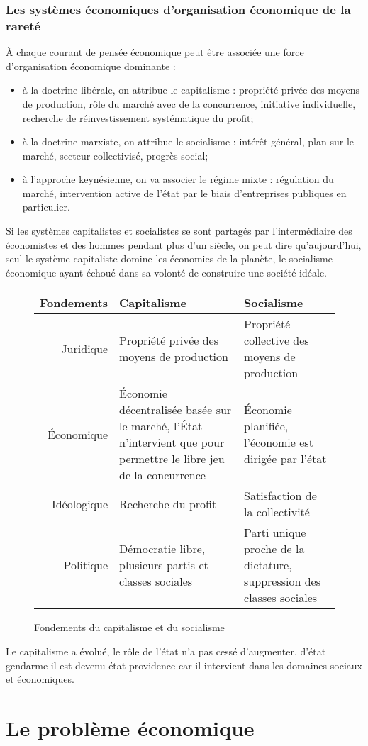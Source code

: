 \documentclass[11pt]{article}
\begin{document}
	\section{Les systèmes économiques d'organisation économique de la rareté}
		À chaque courant de pensée économique peut être associée une force d'organisation économique dominante :
		\begin{itemize}
			\item à la doctrine libérale, on attribue le capitalisme : propriété privée des moyens de production, rôle du marché avec de la concurrence, initiative individuelle, recherche de réinvestissement systématique du profit;
			\item à la doctrine marxiste, on attribue le socialisme : intérêt général, plan sur le marché, secteur collectivisé, progrès social;
			\item à l'approche keynésienne, on va associer le régime mixte : régulation du marché, intervention active de l'état par le biais d'entreprises publiques en particulier.
		\end{itemize}
		
		Si les systèmes capitalistes et socialistes se sont partagés par l'intermédiaire des économistes et des hommes pendant plus d'un siècle, on peut dire qu'aujourd'hui, seul le système capitaliste domine les économies de la planète, le socialisme économique ayant échoué dans sa volonté de construire une société idéale.
		
		\begin{figure}[h!]
			\begin{center}
				\begin{tabular}{|r|p{5cm}|p{5cm}|}
					\hline
					\textbf{Fondements} & \textbf{Capitalisme} & \textbf{Socialisme} \\
					\hline
					Juridique			& Propriété privée des moyens de production & Propriété collective des moyens de production \\
					Économique			& Économie décentralisée basée sur le marché, l'État n'intervient que pour permettre le libre jeu de la concurrence & Économie planifiée, l'économie est dirigée par l'état \\
					Idéologique			& Recherche du profit & Satisfaction de la collectivité \\
					Politique			& Démocratie libre, plusieurs partis et classes sociales & Parti unique proche de la dictature, suppression des classes sociales \\
					\hline
				\end{tabular}
				\caption{Fondements du capitalisme et du socialisme}
			\end{center}
		\end{figure}
		
		Le capitalisme a évolué, le rôle de l'état n'a pas cessé d'augmenter, d'état gendarme il est devenu état-providence car il intervient dans les domaines sociaux et économiques.

\newpage
\part{Le problème économique}
		
\end{document}
